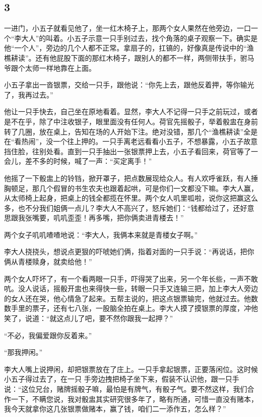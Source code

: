 {\centering\subsection{3}}

一进门，小五子就看见他了，坐一红木椅子上，那两个女人果然在他旁边，一口一个“李大人”的叫着。小五子示意一只手别过去，找个角落的桌子观察一下。确实是他“一个人”，旁边的几个人都不正常。拿扇子的，扛镐的，好像真是传说中的“渔樵耕读”。还有他屁股下面的那红木椅子，跟别人的都不一样，两侧带扶手，驸马爷跟个太师一样地靠在上面。

小五子拿出一沓银票，交给一只手，跟他说：“你先上去，跟他反着押，等你输光了，我再过去。”

他让一只手快去，自己坐在原地看着。显然，李大人不记得一只手之前玩过，或者是不在乎，除了中注收银子，眼里面没有任何人。荷官先摇骰子，举着骰盅在身前转了几圈，放在桌上，告知在场的人开始下注。绝对没错，那几个“渔樵耕读”全是在“看热闹”，没一个往上押的。一只手离老远看看小五子，不想暴露，小五子故意挡住脸，往别处看。直到一只手抽出一张银票押上去，小五子看回来，荷官等了一会儿，差不多的时候，喊了一声：“买定离手！”

他摇了一下骰盅上的铃铛，掀开罩子，把点数展现给众人。有人欢呼雀跃，有人捶胸顿足，那几个假冒的书生农夫也跟着起哄，可是你们一文都没下嘛。李大人赢，从太师椅上起身，把桌上的钱全都揽在怀里。两个女人叽里呱啦，说你这把赢这么多，也不分我们姐俩一点儿？李大人不高兴了，怒斥她们：“钱都给过了，还好意思跟我张嘴要，叽叽歪歪！再多嘴，把你俩卖进青楼去！”

两个女子叽叽喳喳地说：“李大人，我俩本来就是青楼女子啊。”

李大人挠挠头，想说点更狠的吓唬她们俩，指着对面的一只手说：“再说话，把你俩从青楼赎身，就卖给他！”

两个女人吓坏了，有一个看两眼一只手，吓得哭了出来，另一个年长些，一声不敢吭。没人说话，摇骰开盅也来得快一些，转眼一只手又连输三把，加上李大人旁边的女人还在哭，他心情急了起来。五帮主说的，把这点银票输完，他就过去。他数数手里的票子，还有七八张，一股脑全拍在桌上。李大人摸了摸银票的厚度，冲他笑了，说道：“就这点儿了吧，要不然你跟我一起押？”

“不必，我偏爱跟你反着来。”

“那我押闲。”

李大人嘴上说押闲，却把银票放在了庄上。一只手拿起银票，正要落闲位。这时候小五子得过去了，在一只
手旁边拽把椅子坐下来，假装不认识他，跟一只手说：“这位兄台，赌牌摇骰子嘛，最怕是有牌气，有骰子气。要不然这样，我们合作一下，不瞒您说，我对骰盅其实研究很多年了，略有所通，可惜一直没有赌本，我今天就拿你这几张银票做赌本，赢了钱，咱们二一添作五，怎么样？”

